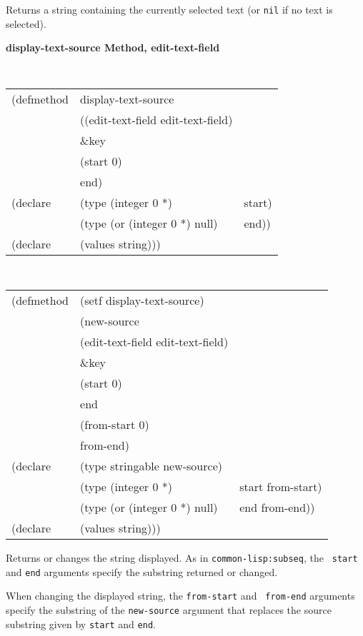 \begin{flushright} \parbox[t]{6.125in}{
Returns a string containing the currently selected text (or {\tt nil} if no text
is selected).} \end{flushright}

        
{\samepage  
{\large {\bf display-text-source \hfill Method, edit-text-field}}
\begin{flushright} \parbox[t]{6.125in}{
\tt
\begin{tabular}{lll}
\raggedright
(defmethod & display-text-source & \\
& ((edit-text-field  edit-text-field)\\
&  \&key \\
&   (start 0)\\
&   end) \\
(declare &(type (integer 0 *) & start)\\
         &(type (or (integer 0 *) null) & end))\\
(declare & (values string)))
\end{tabular}
\rm

}\end{flushright}}

{\samepage
\begin{flushright} \parbox[t]{6.125in}{
\tt
\begin{tabular}{lll}
\raggedright
(defmethod & (setf display-text-source) & \\
         & (new-source \\
         & (edit-text-field  edit-text-field)\\
&  \&key \\
&   (start 0)\\
&   end\\
&   (from-start 0)\\
&   from-end) \\
(declare &(type stringable  new-source)\\
        &(type (integer 0 *) & start from-start)\\
         &(type (or (integer 0 *) null) & end from-end))\\
(declare & (values string)))
\end{tabular}
\rm}
\end{flushright}}

\begin{flushright} \parbox[t]{6.125in}{
Returns or changes the string displayed. As in {\tt common-lisp:subseq}, the {\tt
start} and {\tt end} arguments specify the substring returned or
changed.

When changing the displayed string, the {\tt from-start} and {\tt
from-end} arguments specify the substring of the {\tt new-source}
argument that replaces the source substring given by {\tt start} and
{\tt end}.}
 \end{flushright}





